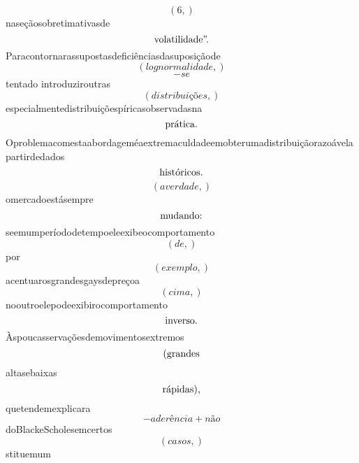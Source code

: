 \documentclass{article}
\begin{document}
\begin{equation}
\left( 6,\right)
\end{equation}naseçãosobretimativasde\begin{equation}
$volatilidade”.$
\end{equation}Paracontornarassupostasdeficiênciasdasuposiçãode\begin{equation}
\left( lognormalidade,\right)
\end{equation}\begin{equation}
- se
\end{equation}tentado introduziroutras\begin{equation}
\left( distribuições,\right)
\end{equation}especialmentedistribuiçõespíricasobservadasna\begin{equation}
$prática.$
\end{equation}Oproblemacomestaabordageméaextremaculdadeemobterumadistribuiçãorazoávelapartirdedados\begin{equation}
$históricos.$
\end{equation}\begin{equation}
\left( averdade,\right)
\end{equation}omercadoestásempre\begin{equation}
$mudando:$
\end{equation}seemumperíododetempoeleexibeocomportamento\begin{equation}
\left( de,\right)
\end{equation}por\begin{equation}
\left( exemplo,\right)
\end{equation}acentuarosgrandesgaysdepreçoa\begin{equation}
\left( cima,\right)
\end{equation}nooutroelepodeexibirocomportamento\begin{equation}
$inverso.$
\end{equation}Àspoucasservaçõesdemovimentosextremos\begin{equation}
$(grandes$
\end{equation}altasebaixas\begin{equation}
$rápidas),$
\end{equation}quetendemexplicara\begin{equation}
- aderência + não
\end{equation}doBlackeScholesemcertos\begin{equation}
\left( casos,\right)
\end{equation}stituemum\begin{equation}

\end{equation}
\end{document}
